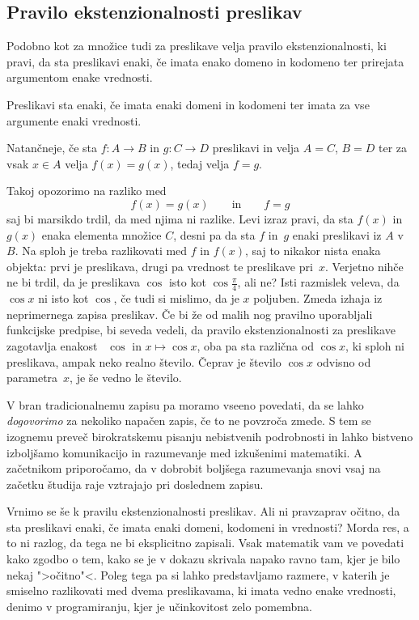 \subsection{Pravilo ekstenzionalnosti preslikav}

Podobno kot za množice tudi za preslikave velja pravilo ekstenzionalnosti, ki pravi, da sta preslikavi enaki, če imata enako domeno in kodomeno ter prirejata argumentom enake vrednosti.


\begin{pravilo}
  Preslikavi sta enaki, če imata enaki domeni in kodomeni ter imata za vse argumente
  enaki vrednosti.
\end{pravilo}

Natančneje, če sta $f : A \to B$ in $g : C \to D$ preslikavi in velja $A = C$, $B = D$ ter
za vsak $x \in A$ velja $f(x) = g(x)$, tedaj velja $f = g$.

Takoj opozorimo na razliko med
%
\begin{equation*}
  f(x) = g(x)
  \qquad\text{in}\qquad
  f = g
\end{equation*}
%
saj bi marsikdo trdil, da med njima ni razlike. Levi izraz pravi, da sta $f(x)$ in $g(x)$
enaka elementa množice $C$, desni pa da sta $f$ in~$g$ enaki preslikavi iz $A$ v $B$. Na
sploh je treba razlikovati med $f$ in $f(x)$, saj to nikakor nista enaka objekta: prvi je
preslikava, drugi pa vrednost te preslikave pri~$x$. Verjetno nihče ne bi trdil, da je
preslikava $\cos$ isto kot $\cos \frac{\pi}{4}$, ali ne? Isti razmislek veleva, da
$\cos x$ ni isto kot $\cos$, če tudi si mislimo, da je $x$ poljuben. Zmeda izhaja iz
neprimernega zapisa preslikav. Če bi že od malih nog pravilno uporabljali funkcijske
predpise, bi seveda vedeli, da pravilo ekstenzionalnosti za preslikave zagotavlja enakost
~$\cos$ in $x \mapsto \cos x$, oba pa sta različna od $\cos x$, ki sploh ni preslikava,
ampak neko realno število. Čeprav je število $\cos x$ odvisno od parametra~$x$, je še
vedno le število.

V bran tradicionalnemu zapisu pa moramo vseeno povedati, da se lahko \emph{dogovorimo} za
nekoliko napačen zapis, če to ne povzroča zmede. S tem se izognemu preveč birokratskemu
pisanju nebistvenih podrobnosti in lahko bistveno izboljšamo komunikacijo in razumevanje
med izkušenimi matematiki. A začetnikom priporočamo, da v dobrobit boljšega razumevanja
snovi vsaj na začetku študija raje vztrajajo pri doslednem zapisu.

Vrnimo se še k pravilu ekstenzionalnosti preslikav. Ali ni pravzaprav očitno, da sta
preslikavi enaki, če imata enaki domeni, kodomeni in vrednosti? Morda res, a to ni razlog,
da tega ne bi eksplicitno zapisali. Vsak matematik vam ve povedati kako zgodbo o tem,
kako se je v dokazu skrivala napako ravno tam, kjer je bilo nekaj ">očitno"<. Poleg tega
pa si lahko predstavljamo razmere, v katerih je smiselno razlikovati med dvema
preslikavama, ki imata vedno enake vrednosti, denimo v programiranju, kjer je učinkovitost
zelo pomembna.

